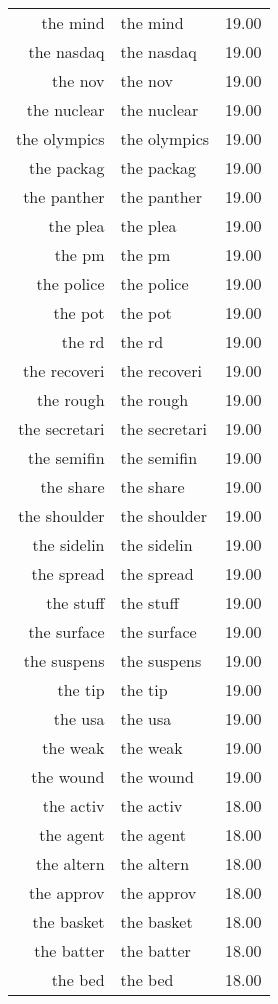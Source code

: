 \begin{table}[ht]
\begin{tabular}{rlr}
  the mind & the mind & 19.00 \\ 
  the nasdaq & the nasdaq & 19.00 \\ 
  the nov & the nov & 19.00 \\ 
  the nuclear & the nuclear & 19.00 \\ 
  the olympics & the olympics & 19.00 \\ 
  the packag & the packag & 19.00 \\ 
  the panther & the panther & 19.00 \\ 
  the plea & the plea & 19.00 \\ 
  the pm & the pm & 19.00 \\ 
  the police & the police & 19.00 \\ 
  the pot & the pot & 19.00 \\ 
  the rd & the rd & 19.00 \\ 
  the recoveri & the recoveri & 19.00 \\ 
  the rough & the rough & 19.00 \\ 
  the secretari & the secretari & 19.00 \\ 
  the semifin & the semifin & 19.00 \\ 
  the share & the share & 19.00 \\ 
  the shoulder & the shoulder & 19.00 \\ 
  the sidelin & the sidelin & 19.00 \\ 
  the spread & the spread & 19.00 \\ 
  the stuff & the stuff & 19.00 \\ 
  the surface & the surface & 19.00 \\ 
  the suspens & the suspens & 19.00 \\ 
  the tip & the tip & 19.00 \\ 
  the usa & the usa & 19.00 \\ 
  the weak & the weak & 19.00 \\ 
  the wound & the wound & 19.00 \\ 
  the activ & the activ & 18.00 \\ 
  the agent & the agent & 18.00 \\ 
  the altern & the altern & 18.00 \\ 
  the approv & the approv & 18.00 \\ 
  the basket & the basket & 18.00 \\ 
  the batter & the batter & 18.00 \\ 
  the bed & the bed & 18.00 \\ 

\end{tabular}
\end{table}

